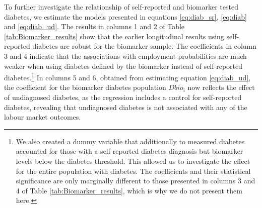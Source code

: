 To further investigate the relationship of self-reported and biomarker tested diabetes, we estimate the models presented in equations \ref{eq:diab_sr}, \ref{eq:diab} and \ref{eq:diab_ud}.  
The results in columns 1 and 2 of Table \ref{tab:Biomarker_results} show that the earlier longitudinal results using self-reported diabetes are robust for the biomarker sample. The coefficients in column 3 and 4 indicate that the associations with employment probabilities are much weaker when using diabetes defined by the biomarker instead of self-reported diabetes.\footnote{We also created a dummy variable that additionally to measured diabetes accounted for those with a self-reported diabetes diagnosis but biomarker levels below the diabetes threshold. This allowed us to investigate the effect for the entire population with diabetes. The coefficients and their statistical significance are only marginally different to those presented in columns 3 and 4 of Table \ref{tab:Biomarker_results}, which is why we do not present them here.} In columns 5 and 6, obtained from estimating equation \ref{eq:diab_ud}, the coefficient for the biomarker diabetes population $Dbio_i$ now reflects the effect of undiagnosed diabetes, as the regression includes a control for self-reported diabetes, revealing that undiagnosed diabetes is not associated with any of the labour market outcomes. 

